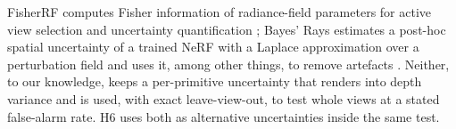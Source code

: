  FisherRF computes Fisher information of radiance-field
parameters for active view selection and uncertainty quantification \cite{unc_fisherrf}; Bayes' Rays
estimates a post-hoc spatial uncertainty of a trained NeRF with a Laplace approximation over a
perturbation field and uses it, among other things, to remove artefacts \cite{unc_bayesrays}. Neither,
to our knowledge, keeps a per-primitive uncertainty that renders into depth variance and is used,
with exact leave-view-out, to test whole views at a stated false-alarm rate. H6 uses both as
alternative uncertainties inside the same test. 

